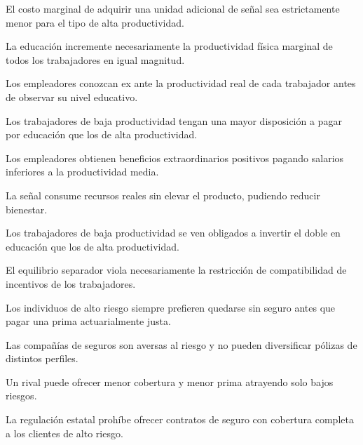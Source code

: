 \begin{opts}
    \item El costo marginal de adquirir una unidad adicional de señal sea estrictamente menor para el tipo de alta productividad.
    \item La educación incremente necesariamente la productividad física marginal de todos los trabajadores en igual magnitud.
    \item Los empleadores conozcan ex ante la productividad real de cada trabajador antes de observar su nivel educativo.
    \item Los trabajadores de baja productividad tengan una mayor disposición a pagar por educación que los de alta productividad.
\end{opts}

\begin{opts}
    \item Los empleadores obtienen beneficios extraordinarios positivos pagando salarios inferiores a la productividad media.
    \item La señal consume recursos reales sin elevar el producto, pudiendo reducir bienestar.
    \item Los trabajadores de baja productividad se ven obligados a invertir el doble en educación que los de alta productividad.
    \item El equilibrio separador viola necesariamente la restricción de compatibilidad de incentivos de los trabajadores.
\end{opts}

\begin{opts}
    \item Los individuos de alto riesgo siempre prefieren quedarse sin seguro antes que pagar una prima actuarialmente justa.
    \item Las compañías de seguros son aversas al riesgo y no pueden diversificar pólizas de distintos perfiles.
    \item Un rival puede ofrecer menor cobertura y menor prima atrayendo solo bajos riesgos.
    \item La regulación estatal prohíbe ofrecer contratos de seguro con cobertura completa a los clientes de alto riesgo.
\end{opts}

